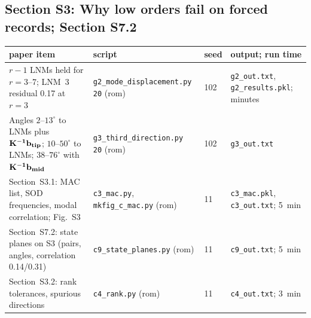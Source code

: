 \documentclass[10pt]{article}
\newcommand{\f}[1]{\texttt{#1}}
\begin{document}
\subsection*{Section S3: Why low orders fail on forced records; Section S7.2}
\begin{longtable}{L{0.31\textwidth}L{0.25\textwidth}L{0.08\textwidth}L{0.25\textwidth}}
\toprule
paper item & script & seed & output; run time\\ \midrule
$r-1$ LNMs held for $r=3$--7; LNM~3 residual 0.17 at $r=3$ & \f{g2\_\allowbreak{}mode\_\allowbreak{}displacement.py 20} (rom) & 102 & \f{g2\_\allowbreak{}out.txt}, \f{g2\_\allowbreak{}results.pkl}; minutes\\
Angles $2$--$13^\circ$ to LNMs plus $\bf K^{-1}b_{tip}$; $10$--$50^\circ$ to LNMs; $38$--$76^\circ$ with $\bf K^{-1}b_{mid}$ & \f{g3\_\allowbreak{}third\_\allowbreak{}direction.py 20} (rom) & 102 & \f{g3\_\allowbreak{}out.txt}\\
Section~S3.1: MAC list, SOD frequencies, modal correlation; Fig.~S3 & \f{c3\_\allowbreak{}mac.py}, \f{mkfig\_\allowbreak{}c\_\allowbreak{}mac.py} (rom) & 11 & \f{c3\_\allowbreak{}mac.pkl}, \f{c3\_\allowbreak{}out.txt}; 5~min\\
Section~S7.2: state planes on S3 (pairs, angles, correlation 0.14/0.31) & \f{c9\_\allowbreak{}state\_\allowbreak{}planes.py} (rom) & 11 & \f{c9\_\allowbreak{}out.txt}; 5~min\\
Section~S3.2: rank tolerances, spurious directions & \f{c4\_\allowbreak{}rank.py} (rom) & 11 & \f{c4\_\allowbreak{}out.txt}; 3~min\\
\bottomrule
\end{longtable}
\end{document}
